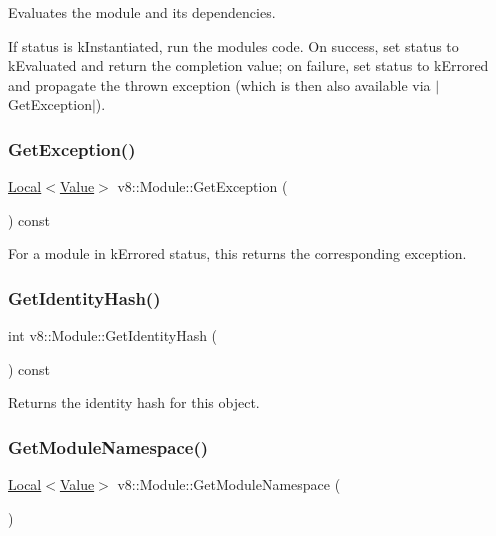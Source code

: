 Evaluates the module and its dependencies.

If status is k\+Instantiated, run the module\textquotesingle{}s code. On success, set status to k\+Evaluated and return the completion value; on failure, set status to k\+Errored and propagate the thrown exception (which is then also available via $\vert$\+Get\+Exception$\vert$). \mbox{\label{classv8_1_1Module_a74ba40e96b4fd457693f11183ecc1dc4}} 
\subsubsection{\texorpdfstring{Get\+Exception()}{GetException()}}
{\footnotesize\ttfamily \mbox{\hyperlink{classv8_1_1Local}{Local}}$<$\mbox{\hyperlink{classv8_1_1Value}{Value}}$>$ v8\+::\+Module\+::\+Get\+Exception (\begin{DoxyParamCaption}{ }\end{DoxyParamCaption}) const}

For a module in k\+Errored status, this returns the corresponding exception. \mbox{\label{classv8_1_1Module_aa2966a54ccb783a91ab494407782e9e3}} 
\subsubsection{\texorpdfstring{Get\+Identity\+Hash()}{GetIdentityHash()}}
{\footnotesize\ttfamily int v8\+::\+Module\+::\+Get\+Identity\+Hash (\begin{DoxyParamCaption}{ }\end{DoxyParamCaption}) const}

Returns the identity hash for this object. \mbox{\label{classv8_1_1Module_a3fd11de1b44b850f3351b2765f32da68}} 
\subsubsection{\texorpdfstring{Get\+Module\+Namespace()}{GetModuleNamespace()}}
{\footnotesize\ttfamily \mbox{\hyperlink{classv8_1_1Local}{Local}}$<$\mbox{\hyperlink{classv8_1_1Value}{Value}}$>$ v8\+::\+Module\+::\+Get\+Module\+Namespace (\begin{DoxyParamCaption}{ }\end{DoxyParamCaption})}

